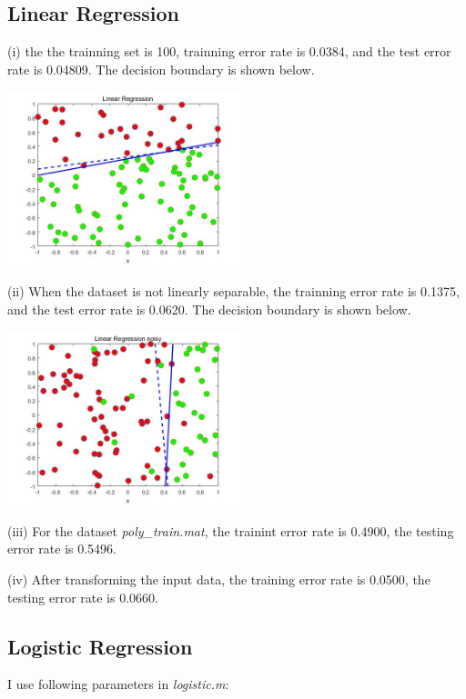 \documentclass[11pt]{article} %
\begin{document}
\subsection{Linear Regression}

(i) the the trainning set is 100, trainning error rate is 0.0384, and the test error rate is 0.04809. The decision boundary is shown below.

\begin{center}
\includegraphics[height=2in]{./LinearReg_i.jpg}
\end{center}

(ii) When the dataset is not linearly separable, the trainning error rate is 0.1375, and the test error rate is 0.0620. The decision boundary is shown below.

\begin{center}
\includegraphics[height=2in]{./LinearReg_ii.jpg}
\end{center}

(iii) For the dataset \emph{poly\_train.mat}, the trainint error rate is 0.4900, the testing error rate is 0.5496.

(iv) After transforming the input data, the training error rate is 0.0500, the testing error rate is 0.0660.

\subsection{Logistic Regression}

I use following parameters in \emph{logistic.m}:
\end{document}
